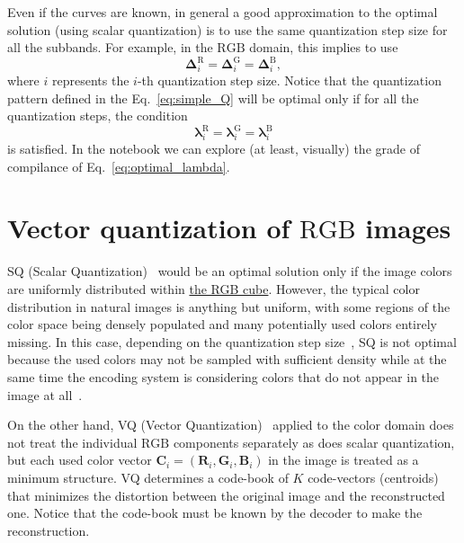 Even if the curves are known, in general a good approximation to the
optimal solution (using scalar quantization) is to use the same
quantization step size for all the subbands. For example, in the
$\text{RGB}$ domain, this implies to use
\begin{equation}
  \mathbf{\Delta}^{\text{R}}_i = \mathbf{\Delta}^{\text{G}}_i =
  \mathbf{\Delta}^{\text{B}}_i,
  \label{eq:simple_Q}
\end{equation}
where $i$ represents the $i$-th quantization step size. Notice that
the quantization pattern defined in the Eq.~\eqref{eq:simple_Q} will
be optimal only if for all the quantization steps, the condition
\begin{equation}
  \mathbf{\lambda}^{\text{R}}_i = \mathbf{\lambda}^{\text{G}}_i =
  \mathbf{\lambda}^{\text{B}}_i
  \label{eq:optimal_lambda}
\end{equation}
is satisfied. In the notebook \href{https://github.com/Sistemas-Multimedia/Sistemas-Multimedia.github.io/blob/master/contents/RGB_SQ/RGB_SQ.ipynb}{} we can explore (at least, visually) the grade of compilance of
Eq.~\eqref{eq:optimal_lambda}.

\section{Vector quantization of $\text{RGB}$ images}

SQ (Scalar
Quantization)~\cite{vruiz__scalar_quantization,sayood2017introduction}
would be an optimal solution only if the image colors are uniformly
distributed within
\href{https://en.wikipedia.org/wiki/RGB_color_model}{the RGB
  cube}. However, the typical color distribution in natural images is
anything but uniform, with some regions of the color space being
densely populated and many potentially used colors entirely
missing. In this case, depending on the quantization step
size~\cite{vruiz__signal_quantization}, SQ is not optimal because the
used colors may not be sampled with suﬃcient density while at the same
time the encoding system is considering colors that do not appear in
the image at all~\cite{burger2016digital}.

On the other hand, VQ (Vector
Quantization)~\cite{vruiz__vector_quantization,sayood2017introduction}
applied to the color domain does not treat the individual $\text{RGB}$
components separately
as does scalar quantization, but each used color vector ${\mathbf C}_i
= ({\mathbf R}_i, {\mathbf G}_i, {\mathbf B}_i )$ in the image is
treated as a minimum structure. VQ determines a code-book of $K$ code-vectors (centroids) that minimizes the distortion between the original image and the reconstructed one. Notice that the code-book must be known by the decoder to make the reconstruction.

